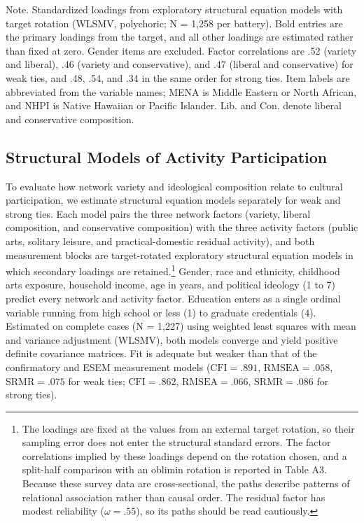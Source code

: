 \documentclass[
  12pt
]{article}
\begin{document}
Note. Standardized loadings from exploratory structural equation models with target rotation (WLSMV, polychoric; N = 1,258 per battery). Bold entries are the primary loadings from the target, and all other loadings are estimated rather than fixed at zero. Gender items are excluded. Factor correlations are .52 (variety and liberal), .46 (variety and conservative), and .47 (liberal and conservative) for weak ties, and .48, .54, and .34 in the same order for strong ties. Item labels are abbreviated from the variable names; MENA is Middle Eastern or North African, and NHPI is Native Hawaiian or Pacific Islander. Lib. and Con. denote liberal and conservative composition.


\subsection{Structural Models of Activity Participation}\label{structural-models-of-activity-participation}

To evaluate how network variety and ideological composition relate to cultural participation, we estimate structural equation models separately for weak and strong ties. Each model pairs the three network factors (variety, liberal composition, and conservative composition) with the three activity factors (public arts, solitary leisure, and practical-domestic residual activity), and both measurement blocks are target-rotated exploratory structural equation models in which secondary loadings are retained.\footnote{The loadings are fixed at the values from an external target rotation, so their sampling error does not enter the structural standard errors. The factor correlations implied by these loadings depend on the rotation chosen, and a split-half comparison with an oblimin rotation is reported in Table A3. Because these survey data are cross-sectional, the paths describe patterns of relational association rather than causal order. The residual factor has modest reliability ($\omega = .55$), so its paths should be read cautiously.} Gender, race and ethnicity, childhood arts exposure, household income, age in years, and political ideology (1 to 7) predict every network and activity factor. Education enters as a single ordinal variable running from high school or less (1) to graduate credentials (4). Estimated on complete cases (N = 1,227) using weighted least squares with mean and variance adjustment (WLSMV), both models converge and yield positive definite covariance matrices. Fit is adequate but weaker than that of the confirmatory and ESEM measurement models ($\text{CFI} = .891$, $\text{RMSEA} = .058$, $\text{SRMR} = .075$ for weak ties; $\text{CFI} = .862$, $\text{RMSEA} = .066$, $\text{SRMR} = .086$ for strong ties).
\end{document}
